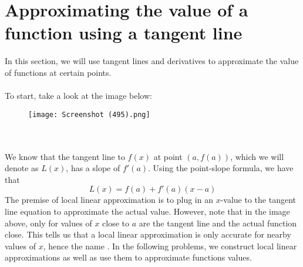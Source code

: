 \documentclass[11pt]{scrartcl}
\begin{document}
\maketitle
\noindent

\section{Approximating the value of a function using a tangent line}
\noindent 
In this section, we will use tangent lines and derivatives to approximate the value of functions at certain points. \\
\\
\noindent 
To start, take a look at the image below: 
\\
\begin{figure}[htp]
    \centering
    \texttt{[image: Screenshot (495).png]}
\end{figure}\\
\\
\noindent 
We know that the tangent line to $f(x)$ at point $(a, f(a))$, which we will denote as $L(x)$, has a slope of $f'(a)$. Using the point-slope formula, we have that 
$$L(x)=f(a)+f'(a)(x-a)$$
The premise of local linear approximation is to plug in an $x$-value to the tangent line equation to approximate the actual value. However, note that in the image above, only for values of $x$ close to $a$ are the tangent line and the actual function close. This tells us that a local linear approximation is only accurate for nearby values of $x$, hence the name . In the following problems, we construct local linear approximations as well as use them to approximate functions values. 
\end{document}
